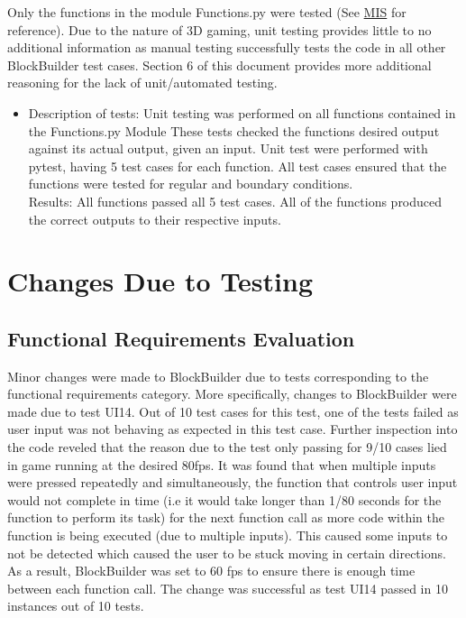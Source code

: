 \documentclass[12pt, titlepage]{article}
\begin{document}
Only the functions in the module Functions.py were tested (See \href{https://gitlab.cas.mcmaster.ca/lucenta/3XA3/blob/master/Doc/Design/MIS/MIS.pdf}{MIS} for reference). Due to the nature of 3D gaming, unit testing provides little to no additional information as manual testing successfully tests the code in all other BlockBuilder test cases. Section 6 of this document provides more additional reasoning for the lack of unit/automated testing.
\begin{itemize}
    \item Description of tests: Unit testing was performed on all functions contained in the Functions.py Module  These tests checked the functions desired output against its actual output, given an input. Unit test were performed with pytest, having 5 test cases for each function. All test cases ensured that the functions were tested for regular and boundary conditions.\\
    Results: All functions passed all 5 test cases. All of the functions produced the correct outputs to their respective inputs.
\end{itemize}

\section{Changes Due to Testing}

\subsection{Functional Requirements Evaluation}
Minor changes were made to BlockBuilder due to tests corresponding to the functional requirements category. More specifically, changes to BlockBuilder were made due to test UI14. Out of 10 test cases for this test, one of the tests failed as user input was not behaving as expected in this test case. Further inspection into the code reveled that the reason due to the test only passing for 9/10 cases lied in game running at the desired 80fps. It was found that when multiple inputs were pressed repeatedly and simultaneously, the function that controls user input would not complete in time (i.e it would take longer than 1/80 seconds for the function to perform its task) for the next function call as more code within the function is being executed (due to multiple inputs). This caused some inputs to not be detected which caused the user to be stuck moving in certain directions. As a result, BlockBuilder was set to 60 fps to ensure there is enough time between each function call. The change was successful as test UI14 passed in 10 instances out of 10 tests.
\end{document}
